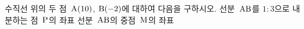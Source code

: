 수직선 위의 두 점~$\mathrm{A}(10)$, $\mathrm{B}(-2)$에 대하여 다음을 구하시오.
 선분~$\mathrm{AB}$를 $1:3$으로 내분하는 점~$\mathrm{P}$의 좌표
 선분~$\mathrm{AB}$의 중점~$\mathrm{M}$의 좌표
